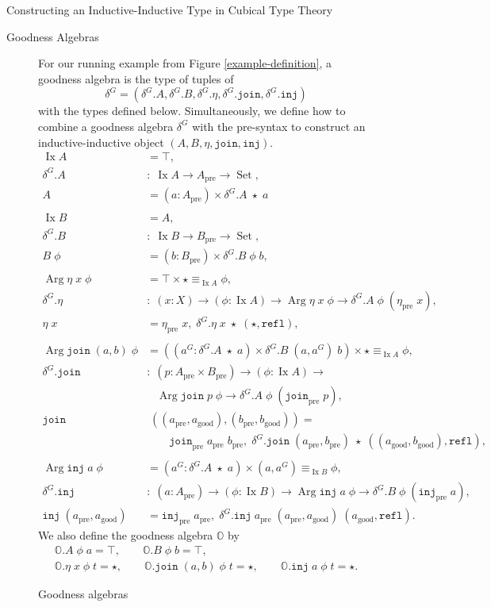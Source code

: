 \documentclass[runningheads]{llncs}
\DeclareMathOperator{\USet}{Set}
\DeclareMathOperator{\Arg}{Arg}
\DeclareMathOperator{\Ix}{Ix}
\newcommand{\pre}[1]{{#1}_\text{pre}}
\newcommand{\good}[1]{{#1}_\text{good}}
\newcommand{\IdA}[3]{{#1}\equiv_{#3}{#2}}
\newcommand{\bbO}{\mathbb{O}}
\newcommand{\join}{\texttt{join}}
\newcommand{\inj}{\texttt{inj}}
\newcommand{\refl}{\texttt{refl}}
\begin{document}
\begin{section}{Constructing an Inductive-Inductive Type in Cubical Type Theory}
\begin{subsection}{Goodness Algebras}
\begin{figure}[htb]
\begin{flushleft}
For our running example from Figure \ref{example-definition}, a goodness algebra is the type of tuples of \[\delta^G = (\delta^G.A, \delta^G.B, \delta^G.\eta, \delta^G.\join, \delta^G.\inj)\] with the types defined below. Simultaneously, we define how to combine a goodness algebra $\delta^G$ with the pre-syntax to construct an inductive-inductive object $(A, B, \eta, \join, \inj)$.
\begin{align*}
\Ix A &= \top,\\
\delta^G.A &:\; \Ix A \to \pre{A} \to \USet,\\
A &= (a : \pre{A}) \times \delta^G.A\;\star\;a\\
\\[-.11in]
\Ix B &= A,\\
\delta^G.B &:\; \Ix B \to \pre{B} \to \USet,\\
B\;\phi &= (b : \pre{B}) \times \delta^G.B\;\phi\;b,\\
\\[-.11in]
\Arg \eta\;x\;\phi &= \top \times \IdA{\star}{\phi}{\Ix A},\\
\delta^G.\eta &:\; (x : X) \to (\phi : \Ix A) \to \Arg \eta \;x\;\phi \to \delta^G.A\;\phi\;(\pre{\eta}\;x),\\
\eta\;x &= \pre{\eta}\;x,\; \delta^G.\eta\;x\;\star\;(\star,\refl),\\
\\[-.11in]
\Arg \join\;(a,b)\;\phi &= ((a^G : \delta^G.A\;\star\;a) \times \delta^G.B\;(a,a^G)\;b) \times\IdA{\star}{\phi}{\Ix A},\\
\delta^G.\join &:\; (p : \pre{A} \times \pre{B}) \to (\phi : \Ix A) \to\\&\;\;\; \Arg\join\;p\;\phi \to \delta^G.A\;\phi\;(\pre{\join}\;p),\\
\join&\;((\pre{a}, \good{a}), (\pre{b}, \good{b})) =\\&\qquad\pre{\join}\;\pre{a}\;\pre{b},\; \delta^G.\join\;(\pre{a}, \pre{b})\;\star\;((\good{a}, \good{b}),\refl),\\
\\[-.11in]
\Arg \inj\;a\;\phi &= (a^G : \delta^G.A\;\star\;a) \times \IdA{(a , a^G)}{\phi}{\Ix B},\\
\delta^G.\inj &:\; (a : \pre{A}) \to (\phi : \Ix B) \to \Arg\inj\;a\;\phi \to \delta^G.B\;\phi\;(\pre{\inj}\;a),\\
\inj\;(\pre{a}, \good{a}) &= \pre{\inj}\;\pre{a},\; \delta^G.\inj\;\pre{a}\;(\pre{a}, \good{a})\;(\good{a}, \refl).
\end{align*}
We also define the goodness algebra $\bbO$ by
\begin{gather*}
\bbO.A\;\phi\;a = \top,\qquad
\bbO.B\;\phi\;b = \top,\\
\bbO.\eta\;x\;\phi\;t = \star,\qquad
\bbO.\join\;(a, b)\;\phi\;t = \star,\qquad
\bbO.\inj\;a\;\phi\;t = \star.
\end{gather*}
\end{flushleft}
\caption{\label{example-goodness-algebra-def}Goodness algebras}
\end{figure}


\end{subsection}
\end{section}
\end{document}
